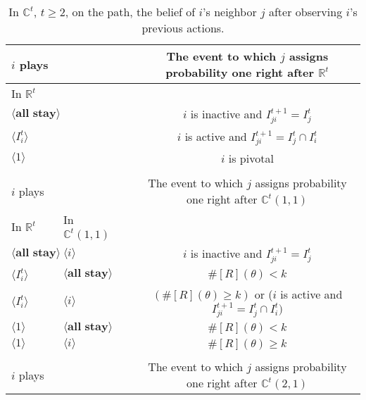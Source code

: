 \documentclass[12pt,letter]{article}
\newcommand{\Kappa}{\mathbb{C}}
\newcommand{\Omicron}{\mathbb{R}}
\theoremstyle{definition}
\theoremstyle{remark}
\theoremstyle{claim}
\begin{document}
\begin{table}[!htbp]
\caption{In $\Kappa^t$, $t\geq 2$, on the path, the belief of $i$'s neighbor $j$ after observing $i$'s previous actions.}
\label{Table_blf_cdt}
\begin{center}
\begin{tabular}{l l l | c}
 $i$ plays  	&&	&	 The event to which $j$ assigns probability one right after $\Omicron^t$\\
\hline
\hline
 In $\Omicron^t$		&&&					 \\
\hline
$\langle \textbf{all stay} \rangle$  &&&     $i$ is inactive and $I^{t+1}_{ji}=I^t_j$ \\
$\langle I^t_{i} \rangle$  &&&     $i$ is active and $I^{t+1}_{ji}=I^t_j\cap I^t_{i}$ \\
$\langle 1 \rangle$  &&& 	  $i$ is pivotal    \\
\hline
\\
 $i$ plays	&&			  & The event to which $j$ assigns probability one right after $\Kappa^t(1,1)$\\
\hline
\hline
	  In $\Omicron^t$	 	&		In $\Kappa^t(1,1)$	&		&		  \\
\hline
$\langle \textbf{all stay} \rangle$  & $\langle i \rangle$	&&    $i$ is inactive and $I^{t+1}_{ji}=I^t_j$  \\
$\langle I^t_{i} \rangle$  & $\langle \textbf{all stay} \rangle$	&&    $\#[R](\theta)< k$ \\
$\langle I^t_{i} \rangle$  & $\langle i \rangle$	&&   $(\#[R](\theta)\geq k )$ or  ($i$ is active and $I^{t+1}_{ji}=I^t_j\cap I^t_{i})$\\
$\langle 1 \rangle$  & $\langle \textbf{all stay} \rangle$	&&	  $\#[R](\theta)< k$    \\
$\langle 1 \rangle$  & $\langle i \rangle$	&&	  $\#[R](\theta)\geq k$  \\
\hline
\\
 $i$ plays  	&		&  	  &The event to which $j$ assigns probability one right after $\Kappa^t(2,1)$\\

\end{tabular}
\end{center}
\end{table}
\end{document}
